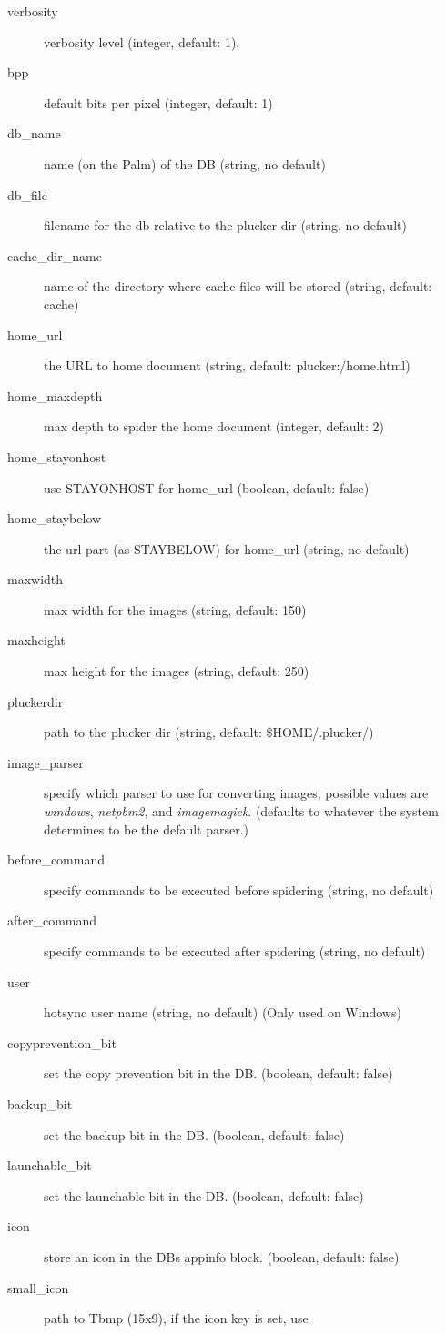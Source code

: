 \begin{description}
\item[verbosity] verbosity level (integer, default: 1).
\item[bpp] default bits per pixel (integer, default: 1)
\item[db\_name] name (on the Palm) of the DB (string, no default)
\item[db\_file] filename for the db relative to the plucker dir
(string, no default)
\item[cache\_dir\_name] name of the directory where cache files will
be stored (string, default: cache)
\item[home\_url] the URL to home document (string, default:
plucker:/home.html)
\item[home\_maxdepth] max depth to spider the home document
(integer, default: 2)
\item[home\_stayonhost] use STAYONHOST for home\_url (boolean,
default: false)
\item[home\_staybelow] the url part (as STAYBELOW) for home\_url
(string, no default)
\item[maxwidth] max width for the images (string, default: 150)
\item[maxheight] max height for the images (string, default: 250)
\item[pluckerdir] path to the plucker dir (string, default:
\$HOME/.plucker/)
\item[image\_parser] specify which parser to use for converting
images, possible values are \emph{windows}, \emph{netpbm2}, and \emph{imagemagick}.
(defaults to whatever the system determines to be the default parser.)
\item[before\_command] specify commands to be executed before spidering
(string, no default)
\item[after\_command] specify commands to be executed after spidering
(string, no default)
\item[user] hotsync user name (string, no default) (Only used on Windows)
\item[copyprevention\_bit] set the copy prevention bit in the DB.
(boolean, default: false)
\item[backup\_bit] set the backup bit in the DB. (boolean, default: false)
\item[launchable\_bit] set the launchable bit in the DB. (boolean,
default: false)
\item[icon] store an icon in the DBs appinfo block. (boolean, default: false)
\item[small\_icon] path to Tbmp (15x9), if the icon key is set, use

\end{description}
